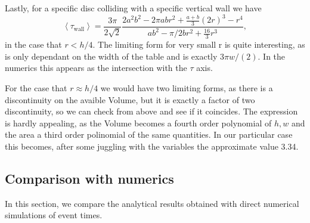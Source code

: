 \documentclass[superscriptaddress,pre,reprint,showpacs,onecolumn]{revtex4-1}
\newcommand{\mean}[1]{\left \langle #1 \right \rangle}
\begin{document}
Lastly, for a specific disc colliding with a specific vertical wall we have
\begin{equation}\label{impactwall}
 \mean{\tau_\text{wall}} = 	
\frac{3 \pi}{2\sqrt{2}}
\frac { 2a^{2} b^{2}  -  2\pi a b r^{2} + \frac{a+b}{3}(2r)^3 - r^4}
{ab^2-\pi/2b r^2 + \frac{16}{3} r^3 },
\end{equation}
in the case that $r<h/4$. The limiting form for very small r is
quite interesting, as is only dependant on the width of the table and is exactly
$3\pi w/(2)$. In the numerics this appears as the intersection with the $\tau$
axis.

For the case that $r\approx h/4$ we would have two limiting forms,
as there is a discontinuity on the avaible Volume, but it is exactly
a factor of two discontinuity, so we can check from above and see
if it coincides. The expression is hardly appealing, as the Volume becomes
a fourth order polynomial of $h,w$ and the area a third order polinomial of
the same quantities. In our particular case this becomes,
after some juggling with the variables the approximate value 3.34. 





\subsection{Comparison with numerics}

In this section, we compare the analytical results obtained with direct numerical simulations of
event times.

\end{document}
